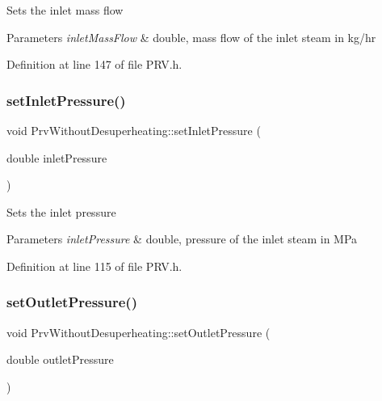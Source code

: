 Sets the inlet mass flow


\begin{DoxyParams}{Parameters}
{\em inlet\+Mass\+Flow} & double, mass flow of the inlet steam in kg/hr \\
\hline
\end{DoxyParams}


Definition at line 147 of file P\+R\+V.\+h.

\mbox{\label{class_prv_without_desuperheating_a26039a0a228ca66f96e8402bf741b9d9}} 
\subsubsection{\texorpdfstring{set\+Inlet\+Pressure()}{setInletPressure()}}
{\footnotesize\ttfamily void Prv\+Without\+Desuperheating\+::set\+Inlet\+Pressure (\begin{DoxyParamCaption}\item[{double}]{inlet\+Pressure }\end{DoxyParamCaption})\hspace{0.3cm}{\ttfamily [inline]}}

Sets the inlet pressure


\begin{DoxyParams}{Parameters}
{\em inlet\+Pressure} & double, pressure of the inlet steam in M\+Pa \\
\hline
\end{DoxyParams}


Definition at line 115 of file P\+R\+V.\+h.

\mbox{\label{class_prv_without_desuperheating_a0f2a4597b58390e5c4a7c75b38bbebbc}} 
\subsubsection{\texorpdfstring{set\+Outlet\+Pressure()}{setOutletPressure()}}
{\footnotesize\ttfamily void Prv\+Without\+Desuperheating\+::set\+Outlet\+Pressure (\begin{DoxyParamCaption}\item[{double}]{outlet\+Pressure }\end{DoxyParamCaption})\hspace{0.3cm}{\ttfamily [inline]}}

